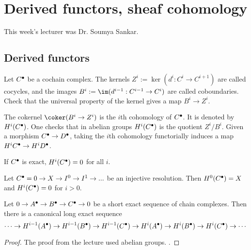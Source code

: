 \chapter{Derived functors, sheaf cohomology}
This week's lecturer was Dr. Soumya Sankar. 

\section{Derived functors}

Let ${C}^\bullet$ be a cochain complex. 
	The kernels $Z^i:= \ker(d^i: C^i \to C^{i+1})$ are called cocycles, and the images $B^i := \im(d^{i-1}: C^{i-1} \to C^i)$ are called coboundaries. Check that the universal property of the kernel gives a map $B^i \to Z^i$. 
\begin{defn}
	The cokernel $\coker(B^i \to Z^i)$ is the $i$th cohomology of ${C}^\bullet$. It is denoted by $\cohomology^i(\cochaincomplex{C})$. One checks that in abelian groups $\cohomology^i(\cochaincomplex{C})$ is the quotient $Z^i/B^i$. 
	Given a morphism ${C}^\bullet \to {D}^\bullet$, taking the $i$th cohomology functorially induces a map $\cohomology^i{\cochaincomplex{C}} \to \cohomology^i{\cochaincomplex{D}}$.
\end{defn}
If ${C}^\bullet$ is exact, $\cohomology^i(\cochaincomplex{C}) = 0$ for all $i$. 

\begin{exc}
	Let ${C}^\bullet = 0 \to X \to I^0 \to I^1 \to ... $ be an injective resolution. Then $\cohomology^0(\cochaincomplex{C}) = X$ and $\cohomology^i(\cochaincomplex{C}) = 0$ for $i > 0$. 
\end{exc}

\begin{lem}
	Let $0 \to {A}^\bullet \to {B}^\bullet \to {C}^\bullet \to 0$ be a short exact sequence of chain complexes. Then there is a canonical long exact sequence 
	\[
    	\cdots \to \cohomology^{i-1}(\cochaincomplex{A}) \to \cohomology^{i-1}(\cochaincomplex{B}) \to \cohomology^{i-1}(\cochaincomplex{C}) \to \cohomology^{i}(\cochaincomplex{A}) \to \cohomology^{i}(\cochaincomplex{B}) \to \cohomology^{i}(\cochaincomplex{C}) \to \cdots 
    \]
\end{lem}
\begin{proof}
	The proof from the lecture used abelian groups. . 
\end{proof}

